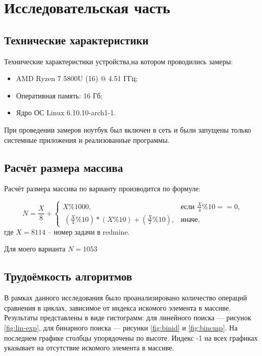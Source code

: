 \chapter{Исследовательская часть}

\section{Технические характеристики}

Технические характеристики устройства,на котором проводились замеры:

\begin{itemize}
	\item AMD Ryzen 7 5800U (16) @ 4.51 ГГц;
	\item Оперативная память: 16 Гб;
	\item Ядро ОС Linux 6.10.10-arch1-1.
\end{itemize}

При проведении замеров ноутбук был включен в сеть и были запущены только системные приложения и реализованные программы.

\section{Расчёт размера массива}

Расчёт размера массива по варианту производится по формуле:

\begin{equation}
	\label{variant}
	N = \frac{X}{8} + \begin{cases}
		X \% 1000,  &\text{если $\frac{X}{4} \% 10 == 0$,} \\
		\ (\frac{X}{4} \% 10) * (X \% 10) + (\frac{X}{2} \% 10), &\text{иначе},
	\end{cases}
\end{equation}
где $X = 8114$ – номер задачи в redmine.

Для моего варианта $N = 1053$

\section{Трудоёмкость алгоритмов}

В рамках данного исследования было проанализировано количество операций сравнения в циклах, зависимое от индекса искомого элемента в массиве. Результаты представлены в виде гистограмм: для линейного поиска — рисунок \ref{fig:lin-exp}, для бинарного поиска — рисунки \ref{fig:binid} и \ref{fig:bincmp}. На последнем графике столбцы упорядочены по высоте. Индекс -1 на всех графиках указывает на отсутствие искомого элемента в массиве.

